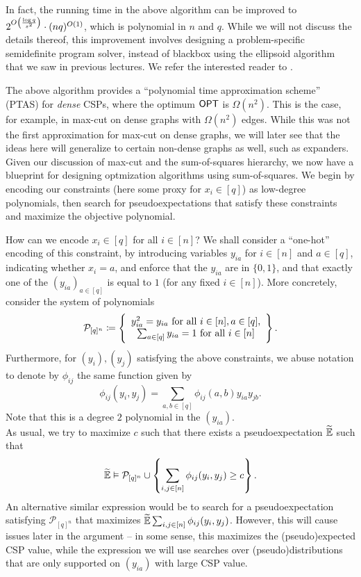 \documentclass{article}
\begin{document}
In fact, the running time in the above algorithm can be improved to $2^{O\left( \frac{\log q}{\varepsilon^2} \right)} \cdot (nq)^{O(1)}$, which is polynomial in $n$ and $q$.
While we will not discuss the details thereof, this improvement involves designing a problem-specific semidefinite program solver, instead of blackbox using the ellipsoid algorithm that we saw in previous lectures. We refer the interested reader to \cite{???}.

The above algorithm provides a ``polynomial time approximation scheme'' (PTAS) for \emph{dense} CSPs, where the optimum $\mathsf{OPT}$ is $\Omega(n^2)$. This is the case, for example, in max-cut on dense graphs with $\Omega(n^2)$ edges. While this was not the first approximation for max-cut on dense graphs, we will later see that the ideas here will generalize to certain non-dense graphs as well, such as expanders. \\

Given our discussion of max-cut and the sum-of-squares hierarchy, we now have a blueprint for designing optmization algorithms using sum-of-squares. We begin by encoding our constraints (here some proxy for $x_i \in [q]$) as low-degree polynomials, then search for pseudoexpectations that satisfy these constraints and maximize the objective polynomial.

How can we encode $x_i \in [q]$ for all $i \in [n]$? We shall consider a ``one-hot'' encoding of this constraint, by introducing variables $y_{ia}$ for $i \in [n]$ and $a \in [q]$, indicating whether $x_i = a$, and enforce that the $y_{ia}$ are in $\{0,1\}$, and that exactly one of the $(y_{ia})_{a \in [q]}$ is equal to $1$ (for any fixed $i \in [n]$). More concretely, consider the system of polynomials
\[ \mathcal{P}_{[q]^n} \coloneqq
\left\{
\begin{array}{c}
	y_{ia}^2 = y_{ia} \text{ for all } i \in [n], a \in [q], \\
	\sum_{a \in [q]} y_{ia} = 1 \text{ for all } i \in [n]
\end{array}
\right\}. \]
Furthermore, for $(y_i),(y_j)$ satisfying the above constraints, we abuse notation to denote by $\phi_{ij}$ the same function given by
\[ \phi_{ij}(y_i,y_j) = \sum_{a,b \in [q]} \phi_{ij}(a,b) y_{ia} y_{jb}. \]
Note that this is a degree $2$ polynomial in the $(y_{ia})$.\\

As usual, we try to maximize $c$ such that there exists a pseudoexpectation $\widetilde{\mathbb{E}}$ such that
\[ \widetilde{\mathbb{E}} \vDash \mathcal{P}_{[q]^n} \cup \left\{ \sum_{i,j \in [n]} \phi_{ij}(y_i,y_j) \ge c \right\}. \]
An alternative similar expression would be to search for a pseudoexpectation satisfying $\mathcal{P}_{[q]^n}$ that maximizes $\widetilde{\mathbb{E}} \sum_{i,j \in [n]} \phi_{ij}(y_i,y_j)$. However, this will cause issues later in the argument -- in some sense, this maximizes the (pseudo)expected CSP value, while the expression we will use searches over (pseudo)distributions that are only supported on $(y_{ia})$ with large CSP value.
\end{document}
